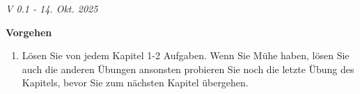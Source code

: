 

\renewcommand{\bbwAufgabenBlockID}{GLS}

\ifisNURAUFGABEN
\newcommand{\LoesungsBlock}[1]{\TRAINER{Lösung:#1
\vspace{1mm}
\hrule}}%
\else
\newcommand{\LoesungsBlock}[1]{\noTRAINER{\TNTeop{}}\TRAINER{Lösung:\,\,\,\,#1
\vspace{1mm}
\hrule}}%
\fi

\usepackage{amssymb} %
\renewcommand{\metaHeaderLine}{Arbeitsblatt Gleichungssysteme}
\renewcommand{\arbeitsblattTitel}{Lineare Gleichungssysteme}

\newcommand{\TNTeopS}[1]{\TRAINER{#1}\noTRAINER{\TNTeop{}}}

\arbeitsblattHeader{}

\begin{center}\textit{\tiny{V 0.1 - 14. Okt. 2025}}\end{center}

\tableofcontents{}

\newpage


\textbf{Vorgehen}


\begin{enumerate}
\item 
Lösen Sie von jedem Kapitel 1-2 Aufgaben. Wenn Sie Mühe haben, lösen
Sie auch die anderen Übungen ansonsten probieren Sie noch die letzte
Übung des Kapitels, bevor Sie zum nächsten Kapitel übergehen.
\end{enumerate}

\newpage

